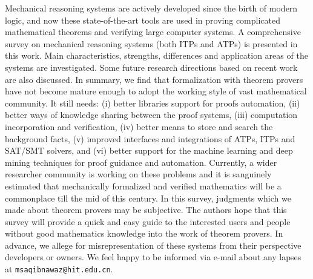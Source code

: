 \label{s6}
Mechanical reasoning systems are actively developed since the birth of modern logic, and now these 
state-of-the-art tools are used in proving complicated mathematical theorems and verifying large computer systems.
A comprehensive survey on  mechanical reasoning systems (both ITPs and ATPs) is presented in this work. Main characteristics, strengths, differences 
and application areas of the systems are investigated. Some future research directions based on recent work are also discussed.
In summary, we find that formalization with theorem provers have not become mature enough to adopt the working style of vast  mathematical 
community. It still needs: (i) better libraries support for proofs automation, (ii) better ways of knowledge sharing between the proof systems, 
(iii) computation incorporation and verification, (iv) better means to store and search the background facts, (v) improved interfaces and integrations of  
ATPs, ITPs and SAT/SMT solvers, and (vi) better support for the machine learning and deep mining techniques for proof guidance and automation. 
Currently, a wider researcher community is working on these problems and it is sanguinely estimated that mechanically formalized and verified 
mathematics will be a commonplace till the mid of this century. 
In this survey, judgments which we made about theorem provers may be subjective. The authors hope that this survey will provide a quick and easy 
guide to the interested users and people without good mathematics knowledge into the work of theorem provers. 
In advance, we allege for misrepresentation of these systems from 
their perspective developers or owners. We feel happy to be informed  via e-mail about any lapses at \texttt{msaqibnawaz@hit.edu.cn}.
